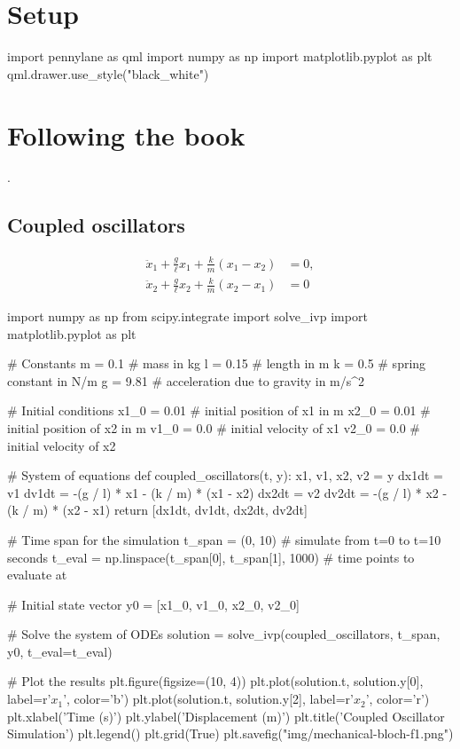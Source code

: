 \section{Setup}


\begin{python}
import pennylane as qml
import numpy as np
import matplotlib.pyplot as plt
qml.drawer.use_style("black_white")
\end{python}

\begin{comment}
\begin{result}
\end{result}
\end{comment}

\newpage

\section{Following the book}
.

\subsection{Coupled oscillators}

\[
\begin{aligned}
  \ddot{x}_1 + \frac{g}{\ell} x_1 + \frac{k}{m} (x_1 - x_2) &= 0, \\
  \ddot{x}_2 + \frac{g}{\ell} x_2 + \frac{k}{m} (x_2 - x_1) &= 0
\end{aligned}
\]


\begin{python}
import numpy as np
from scipy.integrate import solve_ivp
import matplotlib.pyplot as plt

# Constants
m = 0.1  # mass in kg
l = 0.15  # length in m
k = 0.5  # spring constant in N/m
g = 9.81  # acceleration due to gravity in m/s^2

# Initial conditions
x1_0 = 0.01  # initial position of x1 in m
x2_0 = 0.01  # initial position of x2 in m
v1_0 = 0.0  # initial velocity of x1
v2_0 = 0.0  # initial velocity of x2

# System of equations
def coupled_oscillators(t, y):
  x1, v1, x2, v2 = y
  dx1dt = v1
  dv1dt = -(g / l) * x1 - (k / m) * (x1 - x2)
  dx2dt = v2
  dv2dt = -(g / l) * x2 - (k / m) * (x2 - x1)
  return [dx1dt, dv1dt, dx2dt, dv2dt]

# Time span for the simulation
t_span = (0, 10)  # simulate from t=0 to t=10 seconds
t_eval = np.linspace(t_span[0], t_span[1], 1000)  # time points to evaluate at

# Initial state vector
y0 = [x1_0, v1_0, x2_0, v2_0]

# Solve the system of ODEs
solution = solve_ivp(coupled_oscillators, t_span, y0, t_eval=t_eval)

# Plot the results
plt.figure(figsize=(10, 4))
plt.plot(solution.t, solution.y[0], label=r'$x_1$', color='b')
plt.plot(solution.t, solution.y[2], label=r'$x_2$', color='r')
plt.xlabel('Time (s)')
plt.ylabel('Displacement (m)')
plt.title('Coupled Oscillator Simulation')
plt.legend()
plt.grid(True)
plt.savefig("img/mechanical-bloch-f1.png")
\end{python}


